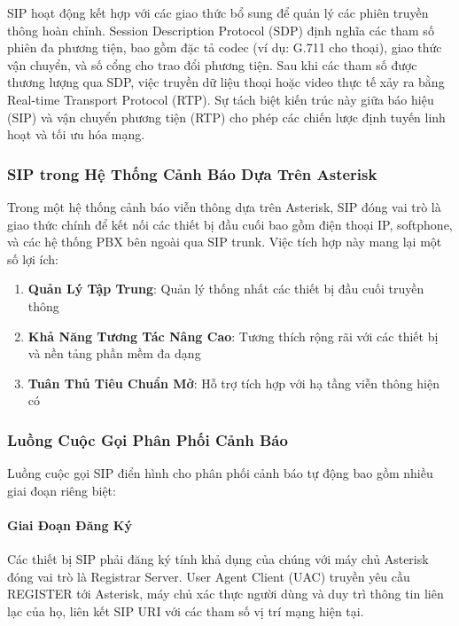SIP hoạt động kết hợp với các giao thức bổ sung để quản lý các phiên truyền thông hoàn chỉnh. Session Description Protocol (SDP) định nghĩa các tham số phiên đa phương tiện, bao gồm đặc tả codec (ví dụ: G.711 cho thoại), giao thức vận chuyển, và số cổng cho trao đổi phương tiện. Sau khi các tham số được thương lượng qua SDP, việc truyền dữ liệu thoại hoặc video thực tế xảy ra bằng Real-time Transport Protocol (RTP). Sự tách biệt kiến trúc này giữa báo hiệu (SIP) và vận chuyển phương tiện (RTP) cho phép các chiến lược định tuyến linh hoạt và tối ưu hóa mạng.

\subsubsection{SIP trong Hệ Thống Cảnh Báo Dựa Trên Asterisk}
\label{subsubsec:sip_asterisk_integration}

Trong một hệ thống cảnh báo viễn thông dựa trên Asterisk, SIP đóng vai trò là giao thức chính để kết nối các thiết bị đầu cuối bao gồm điện thoại IP, softphone, và các hệ thống PBX bên ngoài qua SIP trunk. Việc tích hợp này mang lại một số lợi ích:

\begin{enumerate}
    \item \textbf{Quản Lý Tập Trung}: Quản lý thống nhất các thiết bị đầu cuối truyền thông
    \item \textbf{Khả Năng Tương Tác Nâng Cao}: Tương thích rộng rãi với các thiết bị và nền tảng phần mềm đa dạng
    \item \textbf{Tuân Thủ Tiêu Chuẩn Mở}: Hỗ trợ tích hợp với hạ tầng viễn thông hiện có
\end{enumerate}

\subsubsection{Luồng Cuộc Gọi Phân Phối Cảnh Báo}
\label{subsubsec:sip_alert_flows}

Luồng cuộc gọi SIP điển hình cho phân phối cảnh báo tự động bao gồm nhiều giai đoạn riêng biệt:

\paragraph{Giai Đoạn Đăng Ký}
Các thiết bị SIP phải đăng ký tính khả dụng của chúng với máy chủ Asterisk đóng vai trò là Registrar Server. User Agent Client (UAC) truyền yêu cầu REGISTER tới Asterisk, máy chủ xác thực người dùng và duy trì thông tin liên lạc của họ, liên kết SIP URI với các tham số vị trí mạng hiện tại.

